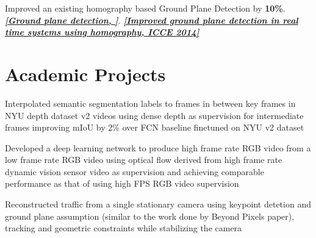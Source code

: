 \documentclass[]{deedy-resume-openfont}
\begin{document}
\begin{minipage}[t]{0.62\textwidth}
\vspace{\topsep} %
\begin{tightemize}
\item Improved an existing homography based Ground Plane Detection by {\bf 10\%}. \href{https://www.google.com/patents/US20150178573}{\bf \textit{[Ground plane detection,  \color{blue}{Patent 2017}]}}. \href{http://ieeexplore.ieee.org/document/6775971/}{\bf \textit{[Improved ground plane detection in real time systems using homography, ICCE 2014]}}
\end{tightemize}
\sectionsep

\section{Academic Projects}


\descript{}
Interpolated semantic segmentation labels to frames in between key frames in NYU depth dataset v2 videos using dense depth as supervision for intermediate frames improving mIoU by 2\% over FCN baseline finetuned on NYU v2 dataset
\sectionsep

\descript{}
Developed a deep learning network to produce high frame rate RGB video from a low frame rate RGB video using optical flow derived from high frame rate dynamic
vision sensor video as supervision and achieving comparable performance as that of using high FPS RGB video supervision
\sectionsep

\descript{}
Reconstructed traffic from a single stationary camera using
keypoint detetion and ground plane assumption (similar to the work done by Beyond Pixels paper), tracking and geometric constraints while stabilizing the camera
\sectionsep



\end{minipage}
\end{document}
